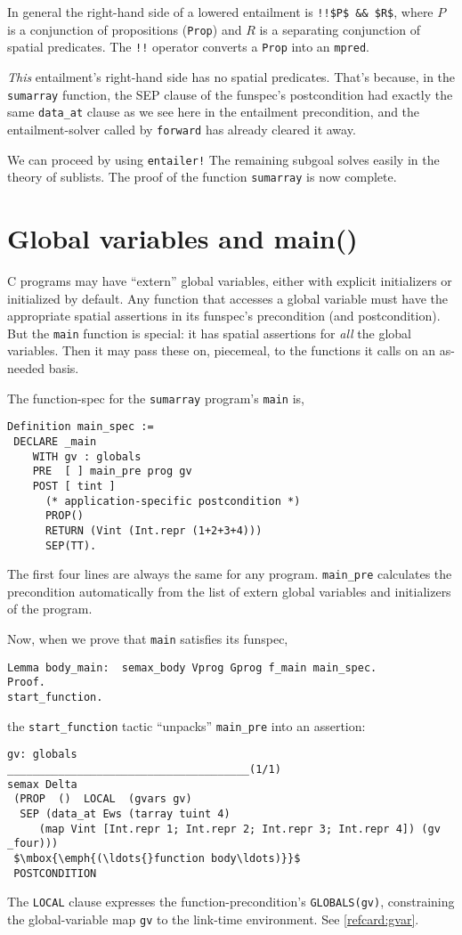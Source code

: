 \documentclass[12pt,fleqn,openany,oneside,showtrims]{memoir}
\begin{document}
In general the right-hand side of a lowered entailment is \lstinline{!!$P$ && $R$},
where $P$ is a conjunction of propositions (\lstinline{Prop})
and $R$ is a separating conjunction of spatial predicates.
The \lstinline{!!} operator converts a \lstinline{Prop} into
an \lstinline{mpred}.

\emph{This} entailment's right-hand side has no spatial
predicates.  That's because, in the \lstinline{sumarray} function,
the SEP clause of the
funspec's postcondition had exactly the same
\lstinline{data_at} clause as we see here in the
entailment precondition, and the entailment-solver
called by \lstinline{forward} has already cleared it away.

We can proceed by using \lstinline{entailer!}
The remaining subgoal solves easily in the
theory of sublists.  The proof of the function
\lstinline{sumarray} is now complete.

\chapter{Global variables and \upshape\textsf{main()}}
C programs may have ``extern'' global variables,
either with explicit initializers or initialized by
default.  Any function that accesses a global
variable must have the appropriate spatial
assertions in its funspec's precondition
(and postcondition).  But the \lstinline{main}
function is special: it has spatial
assertions for \emph{all} the global variables.
Then it may pass these on, piecemeal,
to the functions it calls on an as-needed basis.

The function-spec for the \lstinline{sumarray} program's \lstinline{main} is,
\begin{lstlisting}
Definition main_spec :=
 DECLARE _main  
    WITH gv : globals
    PRE  [ ] main_pre prog gv
    POST [ tint ]
      (* application-specific postcondition *)
      PROP()
      RETURN (Vint (Int.repr (1+2+3+4)))
      SEP(TT).
\end{lstlisting}
The first four lines are always the same for any program.
\lstinline{main_pre} calculates the precondition
automatically from the list of extern global variables
and initializers of the program.\label{main-pre-page}

Now, when we prove that \lstinline{main} satisfies its
funspec,
\begin{lstlisting}
Lemma body_main:  semax_body Vprog Gprog f_main main_spec.
Proof.
start_function.
\end{lstlisting}
the \lstinline{start_function} tactic ``unpacks''
\lstinline{main_pre} into an assertion:
\pagebreak
\begin{lstlisting}
gv: globals
______________________________________(1/1)
semax Delta
 (PROP  ()  LOCAL  (gvars gv)
  SEP (data_at Ews (tarray tuint 4)
     (map Vint [Int.repr 1; Int.repr 2; Int.repr 3; Int.repr 4]) (gv _four)))
 $\mbox{\emph{(\ldots{}function body\ldots)}}$
 POSTCONDITION
\end{lstlisting}
The \lstinline{LOCAL} clause expresses
the function-precondition's \lstinline{GLOBALS(gv)},
constraining the global-variable map \lstinline{gv}
to the link-time environment.   See \autoref{refcard:gvar}.
\end{document}
